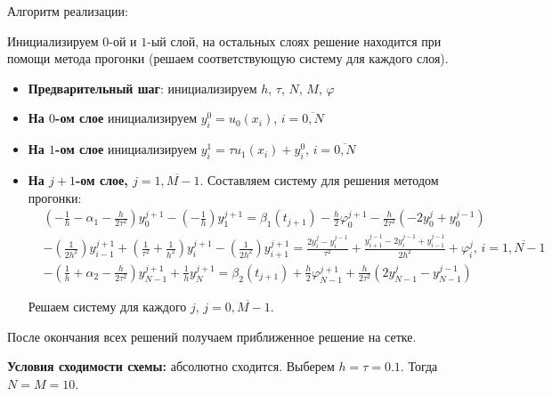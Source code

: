 Алгоритм реализации:\par
Инициализируем $0$-ой и $1$-ый слой, на остальных слоях решение находится при помощи метода прогонки (решаем соответствующую систему для каждого слоя).
\begin{itemize}
\item \textbf{Предварительный шаг}: инициализируем $h$, $\tau$, $N$, $M$, $\varphi$
\item \textbf{На $0$-ом слое} инициализируем $y_{i}^{0} = u_{0}(x_{i})$, $i=\overline{0,N}$
\item \textbf{На $1$-ом слое} инициализируем $y_{i}^{1} = \tau u_{1}(x_{i})+y_{i}^{0}$, $i=\overline{0,N}$
\item { \textbf{На $j+1$-ом слое, $j=\overline{1,M-1}$}. Составляем систему для решения методом прогонки:
\begin{eqnarray*}
& (-\frac{1}{h}-\alpha_{1}-\frac{h}{2\tau^{2}})y_{0}^{j+1} - (-\frac{1}{h})y_{1}^{j+1} = \beta_{1}(t_{j+1}) -\frac{h}{2}\varphi_{0}^{j+1} -\frac{h}{2\tau^{2}}(-2y_{0}^{j}+y_{0}^{j-1}) \\
& -(\frac{1}{2h^{2}})y_{i-1}^{j+1} + (\frac{1}{\tau^{2}} + \frac{1}{h^{2}})y_{i}^{j+1} -(\frac{1}{2h^{2}})y_{i+1}^{j+1} = \frac{2y_{i}^{j}-y_{i}^{j-1}}{\tau^{2}} + \frac{y_{i+1}^{j-1} - 2y_{i}^{j-1} + y_{i-1}^{j-1}}{2h^{2}} + \varphi_{i}^{j}\text{, }i=\overline{1,N-1} \\
& -(\frac{1}{h}+\alpha_{2}-\frac{h}{2\tau^{2}})y_{N-1}^{j+1} + \frac{1}{h}y_{N}^{j+1} = \beta_{2}(t_{j+1}) + \frac{h}{2}\varphi_{N-1}^{j+1} + \frac{h}{2\tau^{2}}(2y_{N-1}^{j}-y_{N-1}^{j-1})
\end{eqnarray*}\par
Решаем систему для каждого $j$, $j=\overline{0,M-1}$.
}
\end{itemize} \par
После окончания всех решений получаем приближенное решение на сетке. \par
\textbf{Условия сходимости схемы:} абсолютно сходится. Выберем $h=\tau=0.1$. Тогда $N=M=10$. \par

